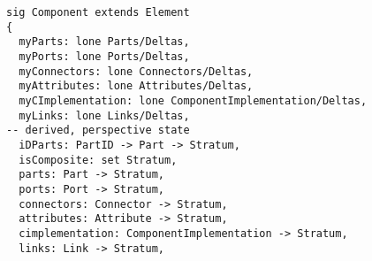 \lstset{frame=tb, aboveskip=12pt, belowskip=-3pt, breaklines=true, basicstyle=\small\ttfamily, tabsize=2, mathescape=true}
\begin{lstlisting}[caption={bb\_structure.als, lines 13-31}, label=alloy:component, captionpos=b]
sig Component extends Element
{
  myParts: lone Parts/Deltas,
  myPorts: lone Ports/Deltas,
  myConnectors: lone Connectors/Deltas,
  myAttributes: lone Attributes/Deltas,
  myCImplementation: lone ComponentImplementation/Deltas,
  myLinks: lone Links/Deltas,
-- derived, perspective state
  iDParts: PartID -> Part -> Stratum,
  isComposite: set Stratum,
  parts: Part -> Stratum,
  ports: Port -> Stratum,
  connectors: Connector -> Stratum,
  attributes: Attribute -> Stratum,
  cimplementation: ComponentImplementation -> Stratum,
  links: Link -> Stratum,
\end{lstlisting}

